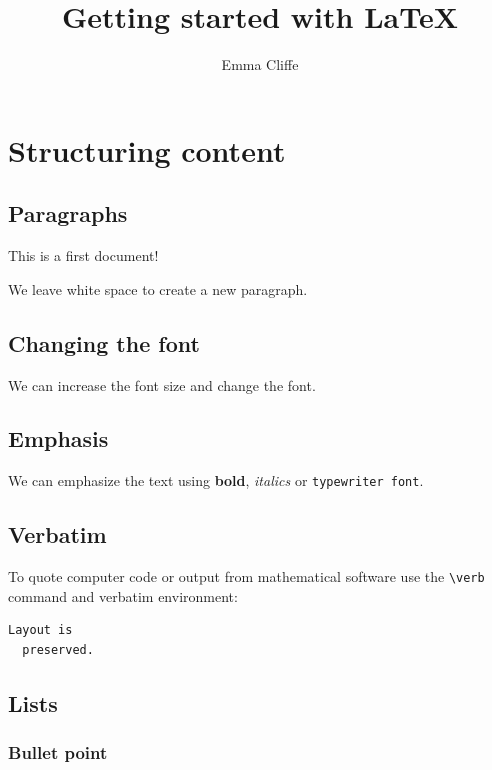 \documentclass[a4paper,12pt]{extarticle}
\title{Getting started with \LaTeX}
\author{Emma Cliffe}
\date{}
\begin{document}
\maketitle
\tableofcontents

\section{Structuring content}

\subsection{Paragraphs}

This is a first document!

We leave white space to create a new paragraph.

\subsection{Changing the font}

We can increase the font size and change the font.

\subsection{Emphasis}

We can emphasize the text using \textbf{bold}, \textit{italics} or \texttt{typewriter font}.

\subsection{Verbatim}

To quote computer code or output from mathematical software use the \verb=\verb= command and verbatim environment:
\begin{verbatim}
Layout is
  preserved.
\end{verbatim}

\subsection{Lists}

\subsubsection{Bullet point}
\end{document}
